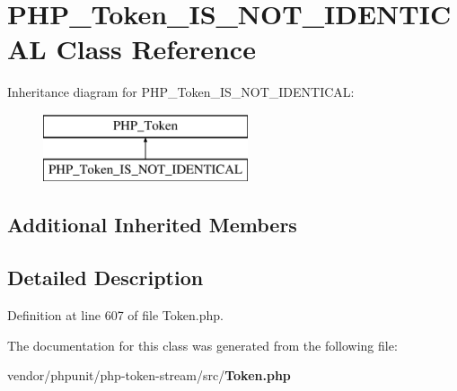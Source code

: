 \section{P\+H\+P\+\_\+\+Token\+\_\+\+I\+S\+\_\+\+N\+O\+T\+\_\+\+I\+D\+E\+N\+T\+I\+C\+A\+L Class Reference}
\label{class_p_h_p___token___i_s___n_o_t___i_d_e_n_t_i_c_a_l}
Inheritance diagram for P\+H\+P\+\_\+\+Token\+\_\+\+I\+S\+\_\+\+N\+O\+T\+\_\+\+I\+D\+E\+N\+T\+I\+C\+A\+L\+:\begin{figure}[H]
\begin{center}
\leavevmode
\includegraphics[height=2.000000cm]{class_p_h_p___token___i_s___n_o_t___i_d_e_n_t_i_c_a_l}
\end{center}
\end{figure}
\subsection*{Additional Inherited Members}


\subsection{Detailed Description}


Definition at line 607 of file Token.\+php.



The documentation for this class was generated from the following file\+:\begin{DoxyCompactItemize}
\item 
vendor/phpunit/php-\/token-\/stream/src/{\bf Token.\+php}\end{DoxyCompactItemize}
